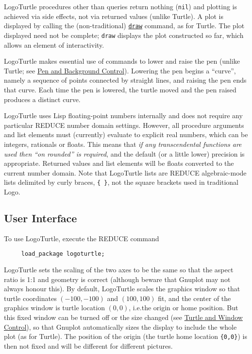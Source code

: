 LogoTurtle procedures other than queries return nothing (\texttt{nil})
and plotting is achieved via side effects, not via returned values
(unlike Turtle).  A plot is displayed by calling the (non-traditional)
\hyperref[logoturtle:draw]{\texttt{draw}} command, as for Turtle.
The plot displayed need not be complete; \texttt{draw} displays the
plot constructed so far, which allows an element of interactivity.

LogoTurtle makes essential use of commands to lower and raise the pen
(unlike Turtle; see \hyperref[logoturtle:PBC]{Pen and Background
  Control}).  Lowering the pen begins a ``curve'', namely a sequence
of points connected by straight lines, and raising the pen ends that
curve.  Each time the pen is lowered, the turtle moved and the pen
raised produces a distinct curve.

LogoTurtle uses Lisp floating-point numbers internally and does not
require any particular REDUCE number domain settings.  However, all
procedure arguments and list elements must (currently) evaluate to
explicit real numbers, which can be integers, rationals or floats.
This means that \emph{if any transcendental functions are used then
``on rounded'' is required}, and the default (or a little lower)
precision is appropriate.  Returned values and list elements will be
floats converted to the current number domain.  Note that LogoTurtle
lists are REDUCE algebraic-mode lists delimited by curly braces,
\texttt{\{~\}}, not the square brackets used in traditional Logo.

\subsection{User Interface}

To use LogoTurtle, execute the REDUCE command
\begin{verbatim}
     load_package logoturtle;
\end{verbatim}

LogoTurtle sets the scaling of the two axes to be the same so that the
aspect ratio is 1:1 and geometry is correct (although beware that
Gnuplot may not always honour this).  By default, LogoTurtle scales
the graphics window so that turtle coordinates $(-100,-100)$ and
$(100,100)$ fit, and the center of the graphics window is turtle
location $(0,0)$, i.e.\@ the origin or home position.  But this fixed
window can be turned off or the size changed (see
\hyperref[logoturtle:TWC]{Turtle and Window Control}), so that Gnuplot
automatically sizes the display to include the whole plot (as for
Turtle).  The position of the origin (the turtle home location
\texttt{\{0,0\}}) is then not fixed and will be different for
different pictures.


